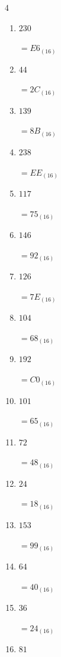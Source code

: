 \begin{multicols}{4}
\begin{enumerate}
        $=E0_{(16)}$

\columnbreak %

  \item $230$

        $=E6_{(16)}$

  \item $44$

        $=2C_{(16)}$

  \item $139$

        $=8B_{(16)}$

  \item $238$

        $=EE_{(16)}$

  \item $117$

        $=75_{(16)}$

  \item $146$

        $=92_{(16)}$

  \item $126$

        $=7E_{(16)}$

  \item $104$

        $=68_{(16)}$

  \item $192$

        $=C0_{(16)}$

  \item $101$

        $=65_{(16)}$

  \item $72$

        $=48_{(16)}$

  \item $24$

        $=18_{(16)}$

  \item $153$

        $=99_{(16)}$

  \item $64$

        $=40_{(16)}$

  \item $36$

        $=24_{(16)}$

\columnbreak %

  \item $81$


\end{enumerate}
\end{multicols}
